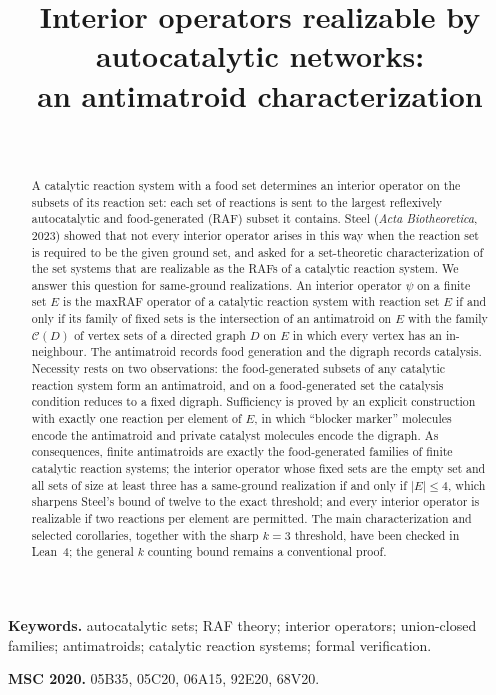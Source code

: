 \documentclass[11pt,a4paper]{article}
\title{Interior operators realizable by autocatalytic networks:\\ an antimatroid characterization}
\author{\PaperAuthor\\ \PaperAffiliation}
\date{\PaperDate}
\theoremstyle{plain}
\theoremstyle{definition}
\theoremstyle{remark}
\newcommand{\cC}{\mathcal{C}}
\begin{document}
\maketitle

\begin{abstract}
A catalytic reaction system with a food set determines an interior operator on the subsets of its reaction set: each set of reactions is sent to the largest reflexively autocatalytic and food-generated (RAF) subset it contains. Steel (\emph{Acta Biotheoretica}, 2023) showed that not every interior operator arises in this way when the reaction set is required to be the given ground set, and asked for a set-theoretic characterization of the set systems that are realizable as the RAFs of a catalytic reaction system. We answer this question for same-ground realizations. An interior operator $\psi$ on a finite set $E$ is the maxRAF operator of a catalytic reaction system with reaction set $E$ if and only if its family of fixed sets is the intersection of an antimatroid on $E$ with the family $\cC(D)$ of vertex sets of a directed graph $D$ on $E$ in which every vertex has an in-neighbour. The antimatroid records food generation and the digraph records catalysis. Necessity rests on two observations: the food-generated subsets of any catalytic reaction system form an antimatroid, and on a food-generated set the catalysis condition reduces to a fixed digraph. Sufficiency is proved by an explicit construction with exactly one reaction per element of $E$, in which ``blocker marker'' molecules encode the antimatroid and private catalyst molecules encode the digraph. As consequences, finite antimatroids are exactly the food-generated families of finite catalytic reaction systems; the interior operator whose fixed sets are the empty set and all sets of size at least three has a same-ground realization if and only if $|E|\le 4$, which sharpens Steel's bound of twelve to the exact threshold; and every interior operator is realizable if two reactions per element are permitted. The main characterization and selected corollaries, together with the sharp $k=3$ threshold, have been checked in Lean~4; the general $k$ counting bound remains a conventional proof.
\end{abstract}

\noindent\textbf{Keywords.} autocatalytic sets; RAF theory; interior operators; union-closed families; antimatroids; catalytic reaction systems; formal verification.

\medskip
\noindent\textbf{MSC 2020.} 05B35, 05C20, 06A15, 92E20, 68V20.
\end{document}
